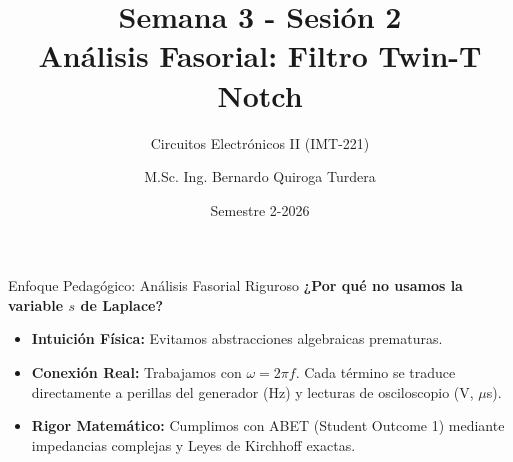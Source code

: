 \documentclass[aspectratio=169, 10pt]{beamer}
\title[Filtro Twin-T Notch]{Semana 3 - Sesión 2\\Análisis Fasorial: Filtro Twin-T Notch}
\subtitle{Circuitos Electrónicos II (IMT-221)}
\author[M.Sc. Ing. B. Quiroga]{M.Sc. Ing. Bernardo Quiroga Turdera}
\institute[UCB Tarija]{Universidad Católica Boliviana ``San Pablo''}
\date{Semestre 2-2026}
\begin{document}
\begin{frame}
    \titlepage
\end{frame}

\begin{frame}{Enfoque Pedagógico: Análisis Fasorial Riguroso}
    \textbf{¿Por qué no usamos la variable $s$ de Laplace?}
    \vspace{0.3cm}
    \begin{itemize}[itemsep=5pt]
        \item \textbf{Intuición Física:} Evitamos abstracciones algebraicas prematuras.
        \item \textbf{Conexión Real:} Trabajamos con $\omega = 2\pi f$. Cada término se traduce directamente a perillas del generador (Hz) y lecturas de osciloscopio (V, $\mu$s).
        \item \textbf{Rigor Matemático:} Cumplimos con ABET (Student Outcome 1) mediante impedancias complejas y Leyes de Kirchhoff exactas.
    \end{itemize}
\end{frame}
\end{document}
